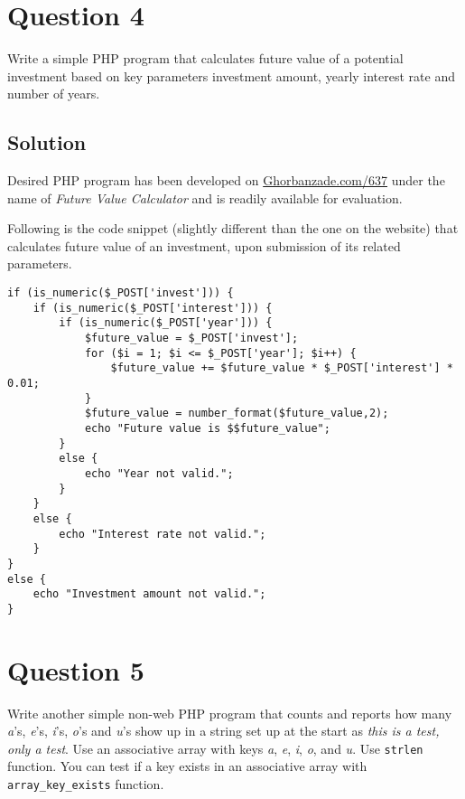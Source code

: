 
\section*{Question 4}

Write a simple PHP program that calculates future value of a potential investment based on key parameters investment amount, yearly interest rate and number of years.

\subsection*{Solution}

Desired PHP program has been developed on \href{http://ghorbanzade.com/cs637?p=2&s=1}{Ghorbanzade.com/637} under the name of \textit{Future Value Calculator} and is readily available for evaluation.

Following is the code snippet (slightly different than the one on the website) that calculates future value of an investment, upon submission of its related parameters.

\lstset{language=PHP}
\lstset{frame=tb}
\lstset{numbers=left}
\begin{lstlisting}
if (is_numeric($_POST['invest'])) {
	if (is_numeric($_POST['interest'])) {
		if (is_numeric($_POST['year'])) {
			$future_value = $_POST['invest'];
			for ($i = 1; $i <= $_POST['year']; $i++) {
				$future_value += $future_value * $_POST['interest'] * 0.01;
			}
			$future_value = number_format($future_value,2);
			echo "Future value is $$future_value";
		}
		else {
			echo "Year not valid.";
		}
	}
	else {
		echo "Interest rate not valid.";
	}
}
else {
	echo "Investment amount not valid.";
}
\end{lstlisting}

\section*{Question 5}
Write another simple non-web PHP program that counts and reports how many \textit{a}'s, \textit{e}'s, \textit{i}'s, \textit{o}'s and \textit{u}'s show up in a string set up at the start as \textit{this is a test, only a test}. Use an associative array with keys \textit{a}, \textit{e}, \textit{i}, \textit{o}, and \textit{u}. Use \texttt{strlen} function. You can test if a key exists in an associative array with \texttt{array\_key\_exists} function.

